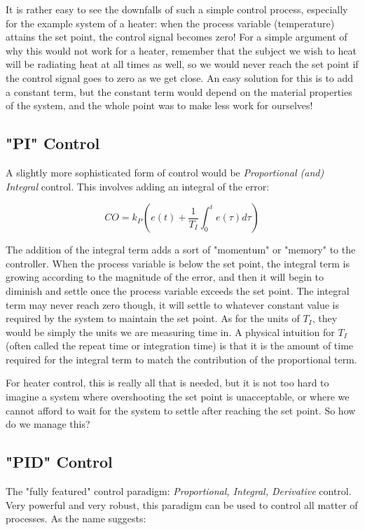 \documentclass[11pt, letterpaper]{article}
\begin{document}
It is rather easy to see the downfalls of such a simple control process, especially for the example system of a heater: when the process variable (temperature) attains the set point, the control signal becomes zero! For a simple argument of why this would not work for a heater, remember that the subject we wish to heat will be radiating heat at all times as well, so we would never reach the set point if the control signal goes to zero as we get close. An easy solution for this is to add a constant term, but the constant term would depend on the material properties of the system, and the whole point was to make less work for ourselves!

\subsection{"PI" Control}
A slightly more sophisticated form of control would be {\it Proportional (and) Integral} control. This involves adding an integral of the error:

$$ CO = k_P \left (e(t) + \frac{1}{T_I} \int_0^t e(\tau) d\tau \right)$$

The addition of the integral term adds a sort of "momentum" or "memory" to the controller. When the process variable is below the set point, the integral term is growing according to the magnitude of the error, and then it will begin to diminish and settle once the process variable exceeds the set point. The integral term may never reach zero though, it will settle to whatever constant value is required by the system to maintain the set point. As for the units of $T_I$, they would be simply the units we are measuring time in. A physical intuition for $T_I$ (often called the repeat time or integration time) is that it is the amount of time required for the integral term to match the contribution of the proportional term.

For heater control, this is really all that is needed, but it is not too hard to imagine a system where overshooting the set point is unacceptable, or where we cannot afford to wait for the system to settle after reaching the set point. So how do we manage this?

\subsection{"PID" Control}
The "fully featured" control paradigm: {\it Proportional, Integral, Derivative} control. Very powerful and very robust, this paradigm can be used to control all matter of processes. As the name suggests:
\end{document}
